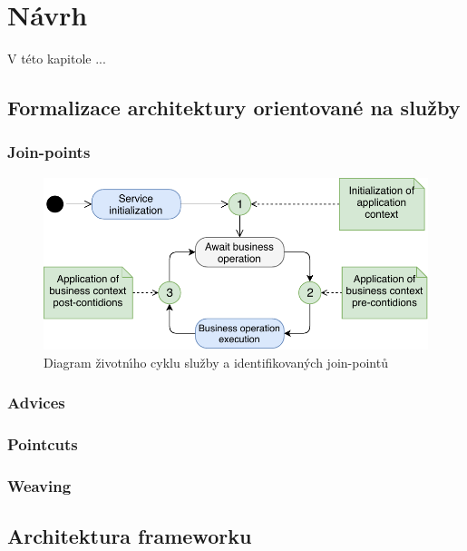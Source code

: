 

\chapter{Návrh}\label{ch:navrh}

V této kapitole ...

\section{Formalizace architektury orientované na služby}

\subsection{Join-points}

\begin{figure}
    \centering
    \includegraphics[keepaspectratio=true, width=0.8\linewidth]{figures/join-points.pdf}
    \caption{Diagram životn\'{\i}ho cyklu služby a identifikovan\'ych join-pointů}
    \label{fig:join-points}
\end{figure} %

\subsection{Advices}

\subsection{Pointcuts}

\subsection{Weaving}

\section{Architektura frameworku}

